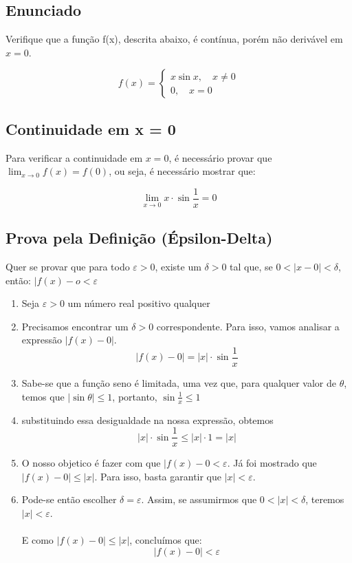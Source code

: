\documentclass[../resumo.tex]{subfiles}
\begin{document}
	\subsection{Enunciado}

	Verifique que a função f(x), descrita abaixo, é contínua, porém não derivável em $x = 0$.

	\begin{equation*}
			f(x) = 
			\begin{cases}
					x\sin{x}, \quad x \neq 0 \\
					0, \quad x = 0
			\end{cases}
	\end{equation*}

	\subsection{Continuidade em x = 0}

	Para verificar a continuidade em $x = 0$, é necessário provar que $\lim_{x\to0}f(x) = f(0)$, ou seja, 
	é necessário mostrar que:

	\begin{equation*}
			\lim_{x\to0}x\cdot\sin{\frac{1}{x}} = 0
	\end{equation*}


	\subsection{Prova pela Definição (Épsilon-Delta)}

	Quer se provar que para todo $\varepsilon > 0$, existe um $\delta > 0$ tal que, se $0 < |x-0| < \delta$, então:
	$|f(x) - o < \varepsilon$

	\begin{enumerate}
			\item Seja $\varepsilon > 0$ um número real positivo qualquer
			\item Precisamos encontrar um $\delta > 0$ correspondente. Para isso, vamos analisar
			a expressão $|f(x) - 0|$.
			\[|f(x) - 0| = |x|\cdot\sin{\frac{1}{x}}\] 
			\item Sabe-se que a função seno é limitada, uma vez que, para qualquer
			valor de $\theta$, temos que $|\sin{\theta}| \leq 1$, portanto, $\sin{\frac{1}{x} \leq 1}$
			\item substituindo essa desigualdade na nossa expressão, obtemos
			\[|x|\cdot\sin{\frac{1}{x}} \leq |x|\cdot1 = |x|\]
			\item O nosso objetico é fazer com que $|f(x) - 0 < \varepsilon$. Já foi mostrado que
			$|f(x) - 0| \leq |x|$. Para isso, basta garantir que $|x| < \varepsilon$.
			\item Pode-se então escolher $\delta = \varepsilon$. Assim, se assumirmos que 
			$0 < |x| < \delta$, teremos $|x| < \varepsilon$. \\
			\\
			E como $|f(x) - 0| \leq |x|$, concluímos que:
			\[|f(x) - 0| < \varepsilon\]
	\end{enumerate}
\end{document}
